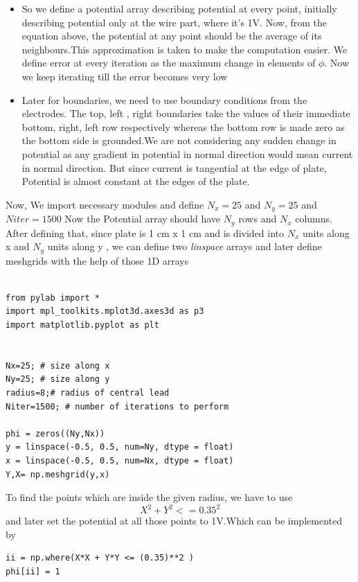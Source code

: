 \documentclass[12pt, a4paper]{report}
\begin{document}
\begin{itemize}
	\item So we define a potential array describing potential at every point, initially describing potential only at the wire part, where it's 1V. Now, from the equation above, the potential at any point should be the average of its neighbours.This approximation is taken to make the computation easier. We define error at every iteration as the maximum change in elements of $\phi$. Now we keep iterating till the error becomes very low
	\item Later for boundaries, we need to use boundary conditions from the electrodes. The top, left , right boundaries take the values of their immediate bottom, right, left row respectively whereas the bottom row is made zero as the bottom side is grounded.We are not considering any sudden change in potential as any gradient in potential in normal direction would mean current in normal direction. But since current is tangential at the edge of plate, Potential is almost constant at the edges of the plate.
\end{itemize}

Now, We import necessary modules and define $N_x = 25 $ and $N_y= 25 $ and $Niter = 1500$ Now the Potential array should have $N_y$ rows and $N_x$ columns. After defining that, since plate is 1 cm x 1 cm and is divided into $N_x$ units along x and $N_y$ units along y , we can define two \textit{linspace} arrays and later define meshgrids with the help of those 1D arrays

\begin{Verbatim}

from pylab import *
import mpl_toolkits.mplot3d.axes3d as p3
import matplotlib.pyplot as plt


Nx=25; # size along x
Ny=25; # size along y
radius=8;# radius of central lead
Niter=1500; # number of iterations to perform

phi = zeros((Ny,Nx))
y = linspace(-0.5, 0.5, num=Ny, dtype = float) 
x = linspace(-0.5, 0.5, num=Nx, dtype = float) 
Y,X= np.meshgrid(y,x)
\end{Verbatim}

To find the points which are inside the given radius, we have to use 
\begin{equation}
X^2 + Y^2 <= 0.35^2
\end{equation}
and later set the potential at all those points to 1V.Which can be implemented by 
\begin{Verbatim}
ii = np.where(X*X + Y*Y <= (0.35)**2 )
phi[ii] = 1
\end{Verbatim}
\end{document}
